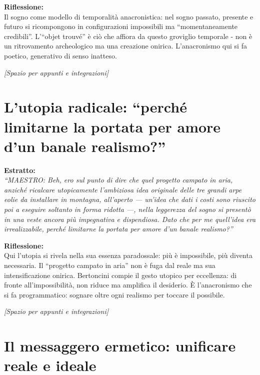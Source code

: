 \documentclass[12pt,a4paper]{article}
\begin{document}
\begin{riflessione}
\textbf{Riflessione:} \\
Il sogno come modello di temporalità anacronistica: nel sogno passato, presente e futuro si ricompongono in configurazioni impossibili ma ``momentaneamente credibili''. L'``objet trouvé'' è ciò che affiora da questo groviglio temporale - non è un ritrovamento archeologico ma una creazione onirica. L'anacronismo qui si fa poetico, generativo di senso inatteso.

\vspace{0.5cm}
\textit{[Spazio per appunti e integrazioni]}
\vspace{1cm}
\end{riflessione}

\section{L'utopia radicale: ``perché limitarne la portata per amore d'un banale realismo?''}

\begin{estratto}
\textbf{Estratto:} \\
\textit{``MAESTRO: Beh, ero sul punto di dire che quel progetto campato in aria, anziché ricalcare utopicamente l'ambiziosa idea originale delle tre grandi arpe eolie da installare in montagna, all'aperto — un'idea che dati i costi sono riuscito poi a eseguire soltanto in forma ridotta —, nella leggerezza del sogno si presentò in una veste ancora più impegnativa e dispendiosa. Dato che per me quell'idea era irrealizzabile, perché limitarne la portata per amore d'un banale realismo?''}
\end{estratto}

\begin{riflessione}
\textbf{Riflessione:} \\
Qui l'utopia si rivela nella sua essenza paradossale: più è impossibile, più diventa necessaria. Il ``progetto campato in aria'' non è fuga dal reale ma sua intensificazione onirica. Bertoncini compie il gesto utopico per eccellenza: di fronte all'impossibilità, non riduce ma amplifica il desiderio. È l'anacronismo che si fa programmatico: sognare oltre ogni realismo per toccare il possibile.

\vspace{0.5cm}
\textit{[Spazio per appunti e integrazioni]}
\vspace{1cm}
\end{riflessione}

\section{Il messaggero ermetico: unificare reale e ideale}
\end{document}
